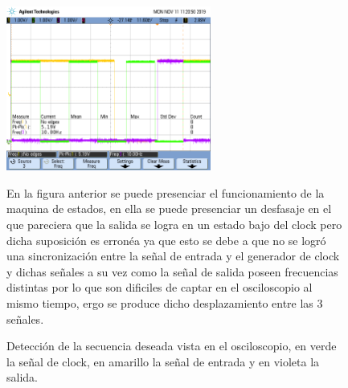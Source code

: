 \begin{figure}[H]
\centering
\includegraphics[width=0.6\textwidth,trim={0 2.2cm 0.1cm 1.75cm},clip]{ImagenesEjercicio2/scope_0.png}
\caption{Detección de la secuencia deseada vista en el osciloscopio, en verde la señal de clock, en amarillo la señal de entrada y en violeta la salida.}

En la figura anterior se puede presenciar el funcionamiento de la maquina de estados, en ella se puede presenciar un desfasaje en el que pareciera que la salida se logra en un estado bajo del clock pero dicha suposición es erronéa ya que esto se debe a que no se logró una sincronización entre la señal de entrada y el generador de clock y dichas señales a su vez como la señal de salida poseen frecuencias distintas por lo que son dificiles de captar en el osciloscopio al mismo tiempo, ergo se produce dicho desplazamiento entre las 3 señales. 
\end{figure}
